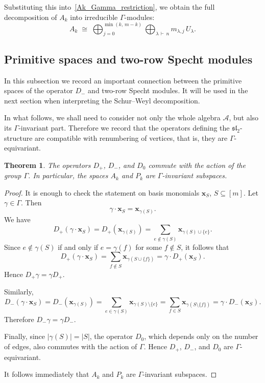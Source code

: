 \documentclass[12pt,reqno]{amsart}
\newtheorem{theorem}{Theorem}[section]
\begin{document}
Substituting this into~\eqref{Ak_Gamma_restriction}, we obtain the full
decomposition of $A_k$ into irreducible $\Gamma$-modules:
\begin{equation}
  A_k
  \;\cong\;
  \bigoplus_{j=0}^{\min(k,\,m-k)}
  \bigoplus_{\lambda \,\vdash\, n}
  m_{\lambda,j}\, U_\lambda.
\end{equation}

\subsection{Primitive spaces and two-row Specht modules}

In this subsection we record an important connection between the primitive
spaces of the operator $D_-$ and two-row Specht modules. It will be used in
the next section when interpreting the Schur--Weyl decomposition.

In what follows, we shall need to consider not only the whole algebra
$\mathcal A$, but also its $\Gamma$-invariant part. Therefore we record that
the operators defining the $\mathfrak{sl}_2$-structure are compatible with
renumbering of vertices, that is, they are $\Gamma$-equivariant.

\begin{theorem}
The operators $D_+$, $D_-$, and $D_0$ commute with the action of the group
$\Gamma$. In particular, the spaces $A_k$ and $P_k$ are
$\Gamma$-invariant subspaces.
\end{theorem}

\begin{proof}
It is enough to check the statement on basis monomials
$\boldsymbol{x}_S$, $S\subseteq[m]$. Let $\gamma\in\Gamma$. Then
$$
\gamma\cdot \boldsymbol{x}_S=\boldsymbol{x}_{\gamma(S)}.
$$
We have
$$
D_+(\gamma\cdot \boldsymbol{x}_S)
=
D_+(\boldsymbol{x}_{\gamma(S)})
=
\sum_{e\notin \gamma(S)}
\boldsymbol{x}_{\gamma(S)\cup\{e\}}.
$$
Since $e\notin\gamma(S)$ if and only if $e=\gamma(f)$ for some
$f\notin S$, it follows that
$$
D_+(\gamma\cdot \boldsymbol{x}_S)
=
\sum_{f\notin S}
\boldsymbol{x}_{\gamma(S\cup\{f\})}
=
\gamma\cdot D_+(\boldsymbol{x}_S).
$$
Hence $D_+\gamma=\gamma D_+$.

Similarly,
$$
D_-(\gamma\cdot \boldsymbol{x}_S)
=
D_-(\boldsymbol{x}_{\gamma(S)})
=
\sum_{e\in\gamma(S)}
\boldsymbol{x}_{\gamma(S)\setminus\{e\}}
=
\sum_{f\in S}
\boldsymbol{x}_{\gamma(S\setminus\{f\})}
=
\gamma\cdot D_-(\boldsymbol{x}_S).
$$
Therefore $D_-\gamma=\gamma D_-$.

Finally, since $|\gamma(S)|=|S|$, the operator $D_0$, which depends only on
the number of edges, also commutes with the action of $\Gamma$. Hence
$D_+$, $D_-$, and $D_0$ are $\Gamma$-equivariant.

It follows immediately that $A_k$ and $P_k$ are $\Gamma$-invariant subspaces.
\end{proof}
\end{document}
